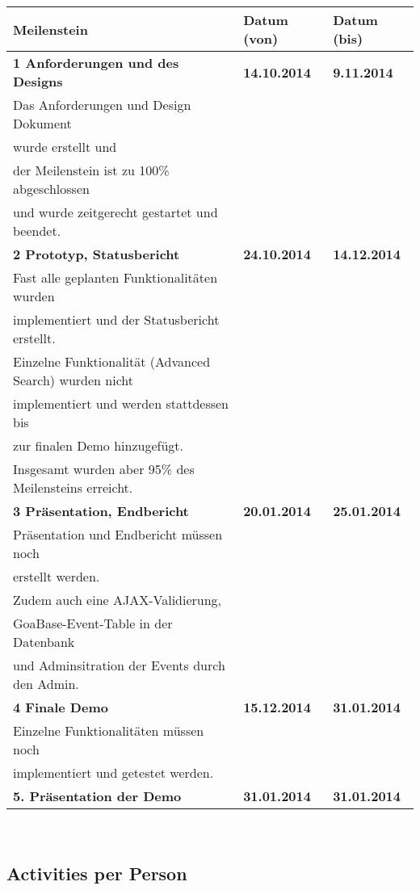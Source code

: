 \documentclass{article}
\begin{document}
\begin{tabular}{lll}
    	\textbf{Meilenstein} & \textbf{Datum (von)} & \textbf{Datum (bis)} \\ \hline \hline
    	
    	\textbf{1 Anforderungen und des Designs} & \textbf{14.10.2014} & \textbf{9.11.2014} \\ 
    	Das Anforderungen und Design Dokument \\ wurde erstellt und \\der Meilenstein ist
    	zu 100\% abgeschlossen \\ und wurde zeitgerecht gestartet und beendet.\\\hline
    	\textbf{2 Prototyp, Statusbericht} & \textbf{24.10.2014} & \textbf{14.12.2014} \\
    	Fast alle geplanten Funktionalitäten wurden \\ implementiert und der Statusbericht erstellt.\\
    	Einzelne Funktionalität (Advanced Search) wurden nicht \\ implementiert
    	und werden stattdessen bis \\ zur finalen Demo hinzugefügt. \\
    	Insgesamt wurden aber 95\% des Meilensteins erreicht. \\\hline
    	\textbf{3 Präsentation, Endbericht} & \textbf{20.01.2014} & \textbf{25.01.2014} \\
    	Präsentation und Endbericht müssen noch \\erstellt werden. \\
    	Zudem auch eine AJAX-Validierung,\\ GoaBase-Event-Table in der Datenbank\\
    	und Adminsitration der Events durch den Admin. \\ \hline
    	\textbf{4 Finale Demo} & \textbf{15.12.2014} & \textbf{31.01.2014} \\
    	Einzelne Funktionalitäten müssen noch \\implementiert und getestet werden. \\
    	\textbf{5. Präsentation der Demo} & \textbf{31.01.2014} & \textbf{31.01.2014} \\
    \end{tabular}\\

\subsection{Activities per Person}
\end{document}
